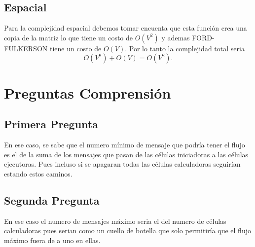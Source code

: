 \documentclass[12pt]{exam}
\begin{document}
\subsection{Espacial}

Para la complejidad espacial debemos tomar encuenta que esta función crea una copia de la matriz lo que tiene un costo de $O\left( V^2 \right) $ y ademas FORD-FULKERSON tiene un costo de $O\left( V \right) $. Por lo tanto la complejidad total seria \[
O\left( V^2 \right) + O\left( V \right)  = O\left( V^2 \right) 
.\] 

\section{Preguntas Comprensión}

\subsection{Primera Pregunta}

En ese caso, se sabe que el numero mínimo de mensaje que podría tener el flujo es el de la suma de los mensajes que pasan de las células iniciadoras a las células ejecutoras. Pues incluso si se apagaran todas las células calculadoras seguirían estando estos caminos.

\subsection{Segunda Pregunta}

En ese caso el numero de mensajes máximo seria el del numero de células calculadoras pues serian como un cuello de botella que solo permitiría que el flujo máximo fuera de a uno en ellas.
\end{document}
